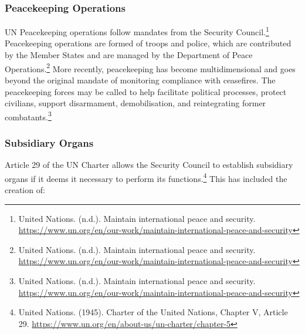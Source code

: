 \subsubsection{Peacekeeping Operations}

UN Peacekeeping operations follow mandates from the Security Council.\footnote{United Nations. (n.d.). Maintain international peace and security. \url{https://www.un.org/en/our-work/maintain-international-peace-and-security}} Peacekeeping operations are formed of troops and police, which are contributed by the Member States and are managed by the Department of Peace Operations.\footnote{United Nations. (n.d.). Maintain international peace and security. \url{https://www.un.org/en/our-work/maintain-international-peace-and-security}} More recently, peacekeeping has become multidimensional and goes beyond the original mandate of monitoring compliance with ceasefires. The peacekeeping forces may be called to help facilitate political processes, protect civilians, support disarmament, demobilisation, and reintegrating former combatants.\footnote{United Nations. (n.d.). Maintain international peace and security. \url{https://www.un.org/en/our-work/maintain-international-peace-and-security}}

\subsubsection{Subsidiary Organs}

Article 29 of the UN Charter allows the Security Council to establish subsidiary organs if it deems it necessary to perform its functions.\footnote{United Nations. (1945). Charter of the United Nations, Chapter V, Article 29. \url{https://www.un.org/en/about-us/un-charter/chapter-5}} This has included the creation of:

